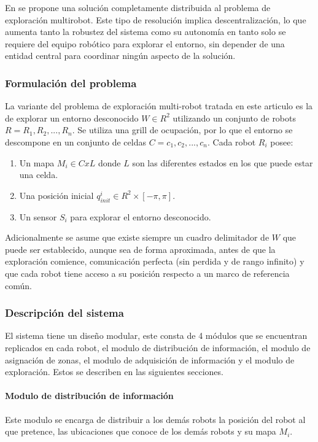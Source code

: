 En \cite{Lopez-Perez2018} se propone una solución completamente distribuida al problema de exploración multirobot. Este tipo de resolución implica descentralización, lo que aumenta tanto la robustez del sistema como su autonomía en tanto solo se requiere del equipo robótico para explorar el entorno, sin depender de una entidad central para coordinar ningún aspecto de la solución. %

\subsubsection{Formulación del problema}
La variante del problema de exploración multi-robot tratada en este articulo es la de explorar un entorno desconocido $W\in R^2$ utilizando un conjunto de robots $R={R_1,R_2,...,R_n}$. Se utiliza una grill  de ocupación, por lo que el entorno se descompone en un conjunto de celdas $C={c_1,c_2,...,c_n}$. Cada robot $R_i$ posee: 
\begin{enumerate}
  \item Un mapa $M_i \in CxL$ donde $L$ son las diferentes estados en los que puede estar una celda. 
  \item Una posición inicial $q_{init}^{i}\in R^2 \times [-\pi,\pi]$. 
  \item Un sensor $S_i$ para explorar el entorno desconocido.
\end{enumerate}

Adicionalmente se asume que existe siempre un cuadro delimitador de $W$ que puede ser establecido, aunque sea de forma aproximada, antes de que la exploración comience, comunicación perfecta (sin perdida y de rango infinito) y que cada robot tiene acceso a su posición respecto a un marco de referencia común.

\subsubsection{Descripción del sistema}
El sistema tiene un diseño modular, este consta de 4 módulos que se encuentran replicados en cada robot, el modulo de distribución de información, el modulo de asignación de zonas, el modulo de adquisición de información y el modulo de exploración. Estos se describen en las siguientes secciones. 

\paragraph{Modulo de distribución de información}
Este modulo se encarga de distribuir a los demás robots la posición del robot al que pretence, las ubicaciones que conoce de los demás robots y su mapa $M_i$. 

